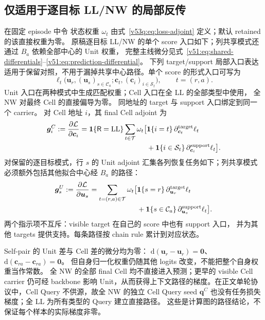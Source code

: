 \documentclass[11pt,UTF8,fontset=fandol]{ctexart}
\numberwithin{equation}{section}
\theoremstyle{definition}
\newcommand{\TargetSet}{\mathcal T}
\begin{document}
\subsection{仅适用于逐目标 LL/NW 的局部反传}
在固定 episode 中令
状态权重 $\omega_t$ 由式~\eqref{v53q:eq:loss-adjoint} 定义；默认 retained 的该直接权重为零。
原稿逐目标 LL/NW 的单个 score 入口如下；列共享模式还通过 $B_a$ 依赖全部中心的 Unit 权重，
完整主线微分见式~\eqref{v51:eq:shared-differentials}--\eqref{v51:eq:prediction-differential}。
下列 target/support 局部入口表达适用于保留对照，不用于漏掉共享中心路径。单个 score 的形式入口可写为
\[
 \ell_t\bigl(\bm u_r,(\bm u_s)_{s\in\mathcal C_a};
             \bm c_t,(\bm c_i)_{i\in\mathcal S_t}\bigr),
 \qquad t=(r,a).
\]
Unit 入口在两种模式中生成匹配权重；Cell 入口在全 LL 的全部类型中使用，
全 NW 对最终 Cell 的直接偏导为零。
同地址的 target 与 support 入口绑定到同一个 carrier。
对 Cell 地址 $i$，其 final Cell adjoint 为
\begin{equation}
\begin{aligned}
 \bm g_i^C:=\frac{\partial\mathcal L}{\partial\bm c_i}
 =\mathbf1\{\mathsf R=\mathrm{LL}\}\sum_{t\in\TargetSet}\omega_t\bigl[
 &\mathbf1\{i=t\}\,\partial^{\rm target}_{\bm c_t}\ell_t\\
 &+\mathbf1\{i\in\mathcal S_t\}\,
        \partial^{\rm support}_{\bm c_i}\ell_t\bigr].
\end{aligned}
\label{eq:T:dual-role-adjoint}
\end{equation}
对保留的逐目标模式，行 $s$ 的 Unit adjoint 汇集各列恢复任务如下；列共享模式必须额外包括其他拟合中心经 $B_a$ 的路径：
\begin{equation}
\begin{aligned}
 \bm g_s^U:=\frac{\partial\mathcal L}{\partial\bm u_s}
 =\sum_{t=(r,a)\in\TargetSet}\omega_t\bigl[
 &\mathbf1\{s=r\}\,\partial^{\rm target}_{\bm u_r}\ell_t\\
 &+\mathbf1\{s\in\mathcal C_a\}\,
        \partial^{\rm support}_{\bm u_s}\ell_t\bigr].
\end{aligned}
\label{eq:T:unit-dual-role-adjoint}
\end{equation}
两个指示项不互斥：visible target 在自己的 score 中也有 support 入口，
并为其他 targets 提供支持。每条路径按 chain rule 累计到对应状态。

Self-pair 的 Unit 差与 Cell 差的微分均为零：
$\mathrm d(\bm u_r-\bm u_r)=\bm0$、
$\mathrm d(\bm c_{ra}-\bm c_{ra})=\bm0$。
但自身归一化权重仍随其他 logits 改变，不能把整个自身权重当作常数。
全 NW 的全部 final Cell 均不直接进入预测；更早的 visible Cell carrier 仍可经 backbone
影响 Unit，从而获得上下文路径的梯度。在正文单轮协议中，Cell Query 不供源，故全 NW 的独立
Cell Query seed $\bm q^C$ 也没有任务损失梯度；全 LL 为所有类型的 Query 建立直接路径。
这些是计算图的路径结论，不保证每个样本的实际梯度非零。
\end{document}
